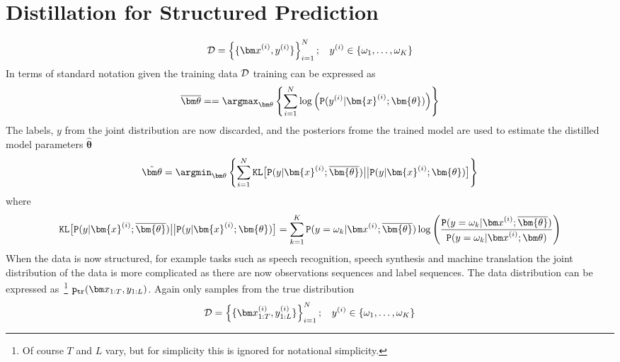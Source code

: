 \section{Distillation for Structured Prediction}

\begin{eqnarray*}
{\cal D}
=
\left\{\{{\bm x}^{(i)},y^{(i)}\}\right\}_{i=1}^N
; \:\:\:\:
y^{(i)}\in\{\omega_1,\ldots,\omega_K\}
\end{eqnarray*}
In terms of standard notation given the training data ${\cal D}$ training can be expressed as
\begin{eqnarray}
{\overline{\bm\theta}} = 
= 
\argmax_{\bm\theta}\left\{
\sum_{i=1}^N
\log\left({\tt P}(y^{(i)}|\bm{x}^{(i)}; {{\bm{\theta}}})\right)
\right\}
\end{eqnarray}
The labels, $y$ from the joint distribution are now discarded, and the posteriors frome the trained model are used to estimate the distilled model parameters ${\hat{\bm\theta}}$
\begin{eqnarray}
{\hat{\bm\theta}} = \argmin_{\bm\theta}\left\{
\sum_{i=1}^N{\tt KL}\big[
{\tt P}(y|\bm{x}^{(i)}; {\overline{\bm{\theta}}})
\big|\big|
{{\tt P}(y|\bm{x}^{(i)}; {{\bm{\theta}}})}
\big]
\right\}
\end{eqnarray}
where
\begin{eqnarray}
{\tt KL}\big[
{\tt P}(y|\bm{x}^{(i)}; {\overline{\bm{\theta}}})
\big|\big|
{{\tt P}(y|\bm{x}^{(i)}; {{\bm{\theta}}})}
\big] = 
\sum_{k=1}^K{\tt P}(y=\omega_k|{\bm x}^{(i)}; {\overline{\bm{\theta}}})\log
\left(
\frac{{\tt P}(y=\omega_k|{\bm x}^{(i)}; {\overline{\bm{\theta}}})}
{{\tt P}(y=\omega_k|{\bm x}^{(i)};{\bm\theta})}
\right)
\end{eqnarray}
When the data is now structured, for example tasks such as speech recognition, speech synthesis and machine translation the joint distribution of the data is more complicated as there are now observations sequences and label sequences. The data distribution can be expressed as~\footnote{Of course $T$ and $L$ vary, but for simplicity this is ignored for notational simplicity.} ${\tt p}_{\tt tr}({\bm x}_{1:T},y_{1:L})$. Again only samples from the true distribution 
\begin{eqnarray*}
{\cal D}
=
\left\{\{{\bm x}^{(i)}_{1:T},y^{(i)}_{1:L}\}\right\}_{i=1}^N
; \:\:\:\:
y^{(i)}\in\{\omega_1,\ldots,\omega_K\}
\end{eqnarray*}
